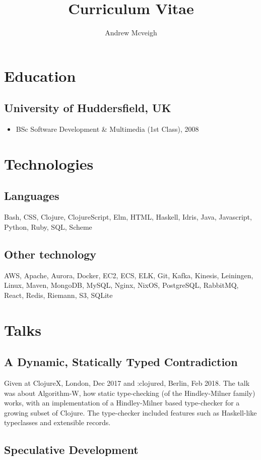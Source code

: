 \documentclass{article}
\title{Curriculum Vitae}
\author{Andrew Mcveigh}
\date{}
\begin{document}
\maketitle
\section*{Education}
\subsection*{University of Huddersfield, UK}
\begin{itemize}
\item BSc Software Development \& Multimedia (1st Class), 2008
\end{itemize}
\section*{Technologies}
\subsection*{Languages}
Bash, CSS, Clojure, ClojureScript, Elm, HTML, Haskell, Idris, Java, Javascript, Python, Ruby, SQL, Scheme
\subsection*{Other technology}
AWS, Apache, Aurora, Docker, EC2, ECS, ELK, Git, Kafka, Kinesis, Leiningen, Linux, Maven, MongoDB, MySQL, Nginx, NixOS, PostgreSQL, RabbitMQ, React, Redis, Riemann, S3, SQLite
\section*{Talks}
\subsection*{A Dynamic, Statically Typed Contradiction}

Given at ClojureX, London, Dec 2017 and :clojured, Berlin, Feb 2018. The talk
was about Algorithm-W, how static type-checking (of the Hindley-Milner family)
works, with an implementation of a Hindley-Milner based type-checker for a
growing subset of Clojure. The type-checker included features such as
Haskell-like typeclasses and extensible records.
\subsection*{Speculative Development}
\end{document}

